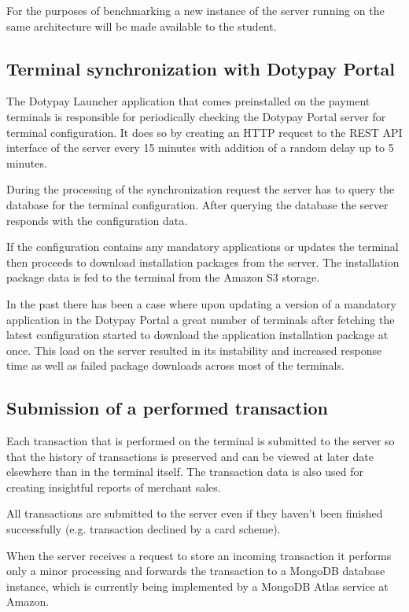 \documentclass[12pt, a4paper]{article}
\begin{document}
For the purposes of benchmarking a new instance of the server running on the same architecture will be made available to the student.

\subsection{Terminal synchronization with Dotypay Portal}
The Dotypay Launcher application that comes preinstalled on the payment terminals is responsible for periodically checking the Dotypay Portal server for terminal configuration. It does so by creating an HTTP request to the REST API interface of the server every 15 minutes with addition of a random delay up to 5 minutes.

During the processing of the synchronization request the server has to query the database for the terminal configuration. After querying the database the server responds with the configuration data. 

If the configuration contains any mandatory applications or updates the terminal then proceeds to download installation packages from the server. The installation package data is fed to the terminal from the Amazon S3 storage.

In the past there has been a case where upon updating a version of a mandatory application in the Dotypay Portal a great number of terminals after fetching the latest configuration started to download the application installation package at once. 
This load on the server resulted in its instability and increased response time as well as failed package downloads across most of the terminals. 

\subsection{Submission of a performed transaction}
Each transaction that is performed on the terminal is submitted to the server so that the history of transactions is preserved and can be viewed at later date elsewhere than in the terminal itself.
The transaction data is also used for creating insightful reports of merchant sales.

All transactions are submitted to the server even if they haven't been finished successfully (e.g. transaction declined by a card scheme).

When the server receives a request to store an incoming transaction it performs only a minor processing and forwards the transaction to a MongoDB database instance, which is currently being implemented by a MongoDB Atlas service at Amazon.
\end{document}
